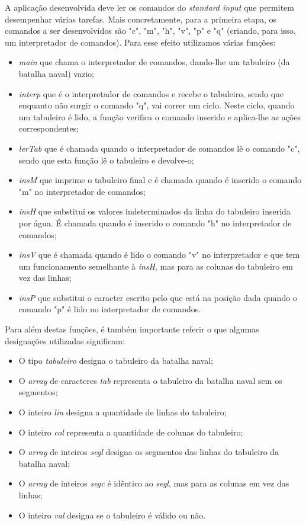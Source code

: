 \documentclass[12pt,a4paper,portuges]{article}
\begin{document}
A aplicação desenvolvida deve ler os comandos do \textit{standard input} que permitem desempenhar várias tarefas. Mais concretamente, para a primeira etapa, os comandos a ser desenvolvidos são "c", "m", "h", "v", "p" e "q" (criando, para isso, um interpretador de comandos). Para esse efeito utilizamos várias funções:
\begin{itemize}
\item \textit{main} que chama o interpretador de comandos, dando-lhe um tabuleiro (da batalha naval) vazio;
\item \textit{interp} que é o interpretador de comandos e recebe o tabuleiro, sendo que enquanto não surgir o comando "q", vai correr um ciclo. Neste ciclo, quando um tabuleiro é lido, a função verifica o comando inserido e aplica-lhe as ações correspondentes;
\item \textit{lerTab} que é chamada quando o interpretador de comandos lê o comando "c", sendo que esta função lê o tabuleiro e devolve-o;
\item \textit{insM} que imprime o tabuleiro final e é chamada quando é inserido o comando "m" no interpretador de comandos;
\item \textit{insH} que substitui os valores indeterminados da linha do tabuleiro inserida por água. É chamada quando é inserido o comando "h" no interpretador de comandos;
\item \textit{insV} que é chamada quando é lido o comando "v" no interpretador e que tem um funcionamento semelhante à \textit{insH}, mas para as colunas do tabuleiro em vez das linhas;
\item \textit{insP} que substitui o caracter escrito pelo que está na posição dada quando o comando "p" é lido no interpretador de comandos.
\end{itemize}

Para além destas funções, é também importante referir o que algumas designações utilizadas significam:
\begin{itemize}
\item O tipo \textit{tabuleiro} designa o tabuleiro da batalha naval;
\item O \textit{array} de caracteres \textit{tab} representa o tabuleiro da batalha naval sem os segmentos;
\item O inteiro \textit{lin} designa a quantidade de linhas do tabuleiro;
\item O inteiro \textit{col} representa a quantidade de colunas do tabuleiro;
\item O \textit{array} de inteiros \textit{segl} designa os segmentos das linhas do tabuleiro da batalha naval; 
\item O \textit{array} de inteiros \textit{segc} é idêntico ao \textit{segl}, mas para as colunas em vez das linhas;
\item O inteiro \textit{val} designa se o tabuleiro é válido ou não.
\end{itemize}
\end{document}

